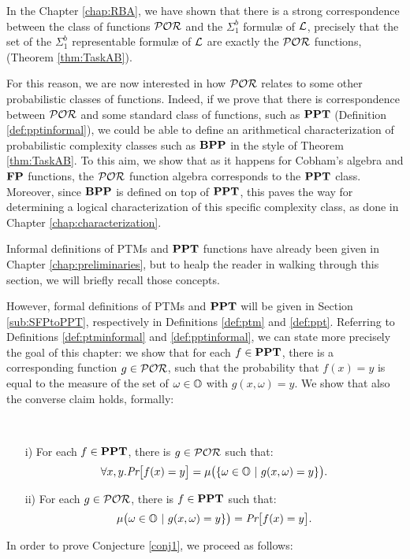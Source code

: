 In the Chapter \ref{chap:RBA}, we have shown that
there is a strong correspondence between the
class of functions $\mathcal{POR}$ and the $\Sigma^b_1$
formul\ae{} of $\mathcal{L}$, precisely that the
set of the $\Sigma^b_1$ representable formul\ae{} of $\mathcal{L}$
are exactly the $\mathcal{POR}$ functions, (Theorem \ref{thm:TaskAB}).

For this reason, we are now interested in how $\mathcal{POR}$ relates to some other probabilistic classes of functions. Indeed,
if we prove that there is correspondence between $\mathcal{POR}$
and some standard class of functions, such as $\mathbf{PPT}$ (Definition \ref{def:pptinformal}),
we could be able to define
an arithmetical characterization of
probabilistic complexity classes such as $\mathbf{BPP}$ in the style of
Theorem \ref{thm:TaskAB}.
%
To this aim, we show that as it happens for Cobham's algebra \cite{Cobham1965} and $\mathbf{FP}$ functions,
the $\mathcal{POR}$ function algebra corresponds to the $\mathbf{PPT}$ class.
%
Moreover, since $\mathbf{BPP}$ is defined on top of $\mathbf{PPT}$,
this paves the way for determining a logical characterization of this specific complexity class,
as done in Chapter \ref{chap:characterization}.

Informal definitions of PTMs and $\mathbf{PPT}$ functions have already been given in Chapter
\ref{chap:preliminaries}, but to healp the reader in
walking through this section,
we will briefly recall those concepts.

{}
%
%
\noindent
However, formal definitions of PTMs and $\mathbf{PPT}$ will
be given in Section \ref{sub:SFPtoPPT}, respectively in
Definitions
\ref{def:ptm}
and
\ref{def:ppt}.
\noindent
Referring to Definitions \ref{def:ptminformal} and \ref{def:pptinformal},
we can state more precisely the goal of this chapter:
we show that for each $f\in \mathbf{PPT}$, there is
a corresponding function $g \in\mathcal{POR}$, such that
the probability that $f(x)=y$ is equal to the measure
of the set of $\omega \in \mathbb{O}$
with $g(x, \omega)= y$.
We show that also the converse claim holds,
formally:
%
\begin{conj}\label{conj1}~
\begin{enumerate}
\itemsep0em
\item[i)] For each $f\in \mathbf{PPT}$, there is $g \in \mathcal{POR}$
such that:
$$
\forall x, y. \emph{Pr}\big[f(x)=y\big] = \mu\big(\{
\omega \in \mathbb{O} \ | \ g(x,\omega)=y\}\big).
$$

\item[ii)] For each $g\in \mathcal{POR}$, there is $f\in \mathbf{PPT}$
such that:
$$
\mu\big(\omega \in \mathbb{O} \ | \ g(x,\omega) = y\}\big)
= \emph{Pr}\big[ f(x) =y \big].
$$
\end{enumerate}
\end{conj}
\noindent
In order to prove Conjecture \ref{conj1}, we proceed as follows:

